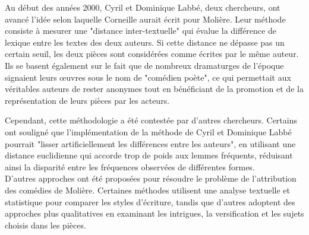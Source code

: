 \vspace{\baselineskip}
\hspace{0,5cm}Au début des années 2000, Cyril et Dominique Labbé, deux chercheurs, ont avancé
l'idée selon laquelle Corneille aurait écrit pour Molière. Leur méthode consiste
à mesurer une "distance inter-textuelle" qui évalue la différence de lexique
entre les textes des deux auteurs. Si cette distance ne dépasse pas un certain
seuil, les deux pièces sont considérées comme écrites par le même auteur. Ils se
basent également sur le fait que de nombreux dramaturges de l'époque signaient
leurs œuvres sous le nom de "comédien poète", ce qui permettait aux véritables
auteurs de rester anonymes tout en bénéficiant de la promotion et de la
représentation de leurs pièces par les acteurs.


\hspace{0,5cm}Cependant, cette méthodologie a été contestée par d'autres chercheurs. Certains
ont souligné que l'implémentation de la méthode de Cyril et Dominique Labbé
pourrait "lisser artificiellement les différences entre les auteurs", en
utilisant une distance euclidienne qui accorde trop de poids aux lemmes
fréquents, réduisant ainsi la disparité entre les fréquences observées de
différentes formes. 
\\D'autres approches ont été proposées pour résoudre le problème de l'attribution
des comédies de Molière. Certaines méthodes utilisent une analyse textuelle et
statistique pour comparer les styles d'écriture, tandis que d'autres adoptent
des approches plus qualitatives en examinant les intrigues, la versification et
les sujets choisis dans les pièces.
